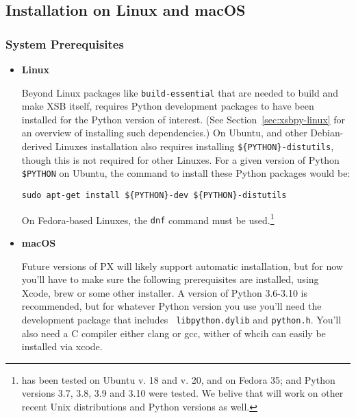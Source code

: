 
\subsection{Installation on Linux and macOS}

\subsubsection{System Prerequisites}

\begin{itemize}
\item {\bf Linux}


Beyond Linux packages like {\tt build-essential} that are needed to
build and make XSB itself, \px{} requires Python development packages
to have been installed for the Python version of interest.  (See
Section~\ref{sec:xsbpy-linux} for an overview of installing such
dependencies.) On Ubuntu, and other Debian-derived Linuxes
installation also requires installing {\tt \$\{PYTHON\}-distutils},
though this is not required for other Linuxes. For a given version of
Python {\tt \$PYTHON} on Ubuntu, the command to install these Python
packages would be:

{\tt sudo apt-get install \$\{PYTHON\}-dev \$\{PYTHON\}-distutils}

On Fedora-based Linuxes, the {\tt dnf} command must be
used.\footnote{\px{} has been tested on Ubuntu v. 18 and v. 20, and on
  Fedora 35; and Python versions 3.7, 3.8, 3.9 and 3.10 were tested.
  We belive that \px{} will work on other recent Unix distributions
  and Python versions as well.}



\item {\bf macOS}

  Future versions of PX will likely support automatic installation,
  but for now you'll have to make sure the following prerequisites are
  installed, using Xcode, brew or some other installer.  A version of
  Python 3.6-3.10 is recommended, but for whatever Python version you
  use you'll need the development package that includes {\tt
    libpython.dylib} and {\tt python.h}.  You'll also need a C
  compiler either clang or gcc, wither of whcih can easily be
  installed via xcode.  
  
\end{itemize}


